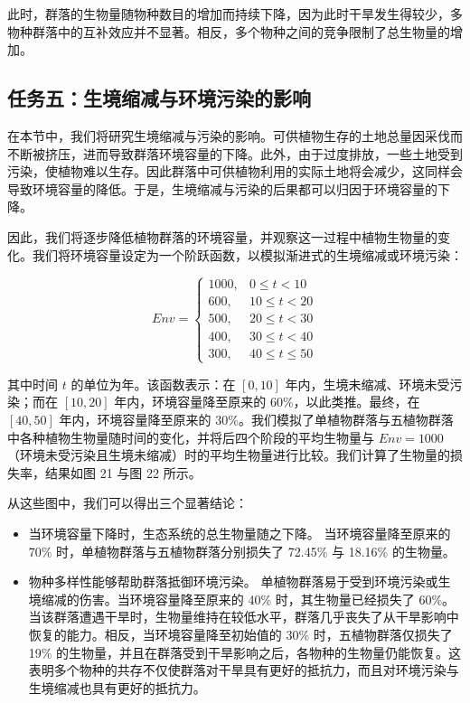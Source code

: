\documentclass[11pt,a4paper]{ctexart}
\begin{document}
此时，群落的生物量随物种数目的增加而持续下降，因为此时干旱发生得较少，多物种群落中的互补效应并不显著。相反，多个物种之间的竞争限制了总生物量的增加。

\subsection{任务五：生境缩减与环境污染的影响}

在本节中，我们将研究生境缩减与污染的影响。可供植物生存的土地总量因采伐而不断被挤压，进而导致群落环境容量的下降。此外，由于过度排放，一些土地受到污染，使植物难以生存。因此群落中可供植物利用的实际土地将会减少，这同样会导致环境容量的降低。于是，生境缩减与污染的后果都可以归因于环境容量的下降。

因此，我们将逐步降低植物群落的环境容量，并观察这一过程中植物生物量的变化。我们将环境容量设定为一个阶跃函数，以模拟渐进式的生境缩减或环境污染：

\begin{equation}
Env=
\begin{cases}
1000, & 0\le t<10\\
600, & 10\le t<20\\
500, & 20\le t<30\\
400, & 30\le t<40\\
300, & 40\le t\le 50
\end{cases}
\label{eq:stepenv}
\end{equation}

其中时间 $t$ 的单位为年。该函数表示：在 $[0,10]$ 年内，生境未缩减、环境未受污染；而在 $[10,20]$ 年内，环境容量降至原来的 60\%，以此类推。最终，在 $[40,50]$ 年内，环境容量降至原来的 30\%。我们模拟了单植物群落与五植物群落中各种植物生物量随时间的变化，并将后四个阶段的平均生物量与 $Env=1000$（环境未受污染且生境未缩减）时的平均生物量进行比较。我们计算了生物量的损失率，结果如图 21 与图 22 所示。

从这些图中，我们可以得出三个显著结论：

\begin{itemize}
\item 当环境容量下降时，生态系统的总生物量随之下降。
当环境容量降至原来的 70\% 时，单植物群落与五植物群落分别损失了 72.45\% 与 18.16\% 的生物量。
\item 物种多样性能够帮助群落抵御环境污染。
单植物群落易于受到环境污染或生境缩减的伤害。当环境容量降至原来的 40\% 时，其生物量已经损失了 60\%。当该群落遭遇干旱时，生物量维持在较低水平，群落几乎丧失了从干旱影响中恢复的能力。相反，当环境容量降至初始值的 30\% 时，五植物群落仅损失了 19\% 的生物量，并且在群落受到干旱影响之后，各物种的生物量仍能恢复。这表明多个物种的共存不仅使群落对干旱具有更好的抵抗力，而且对环境污染与生境缩减也具有更好的抵抗力。
\end{itemize}
\end{document}
